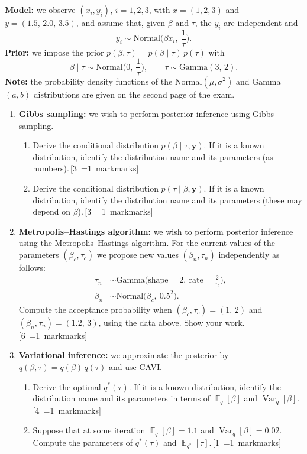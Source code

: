 \documentclass[11pt,a4paper]{article}
\newcommand{\mk}[1]{\hfill\hspace*{\fill}\mbox{\,[#1~\ifnum#1=1 mark\else marks\fi]}}
\newcommand{\ans}[1]{\par\nopagebreak[4]\vspace{2pt}\noindent\fbox{\rule{0pt}{#1}\hspace{\dimexpr\linewidth-2\fboxsep-2\fboxrule\relax}}\par\vspace{4pt}}
\newcommand{\qhead}[2]{\Needspace{10\baselineskip}\vspace{10pt}{\large\bfseries Question #1 (#2 marks)}\par\vspace{2pt}}
\DeclareMathOperator{\E}{\mathbb{E}}
\DeclareMathOperator{\Var}{Var}
\begin{document}
\clearpage
\qhead{7}{17}
\textbf{Model:} we observe $(x_i,y_i)$, $i=1,2,3$, with $x=(1,2,3)$ and $y=(1.5,\,2.0,\,3.5)$, and assume that, given $\beta$ and $\tau$, the $y_i$ are independent and
\[ y_i\sim\text{Normal}\Big(\beta x_i,\ \frac1\tau\Big). \]
\textbf{Prior:} we impose the prior $p(\beta,\tau)=p(\beta\mid\tau)\,p(\tau)$ with
\[ \beta\mid\tau\sim\text{Normal}\Big(0,\ \frac1\tau\Big),\qquad \tau\sim\text{Gamma}(3,\,2). \]
\textbf{Note:} the probability density functions of the Normal$(\mu,\sigma^2)$ and Gamma$(a,b)$ distributions are given on the second page of the exam.

\begin{enumerate}
\item \textbf{Gibbs sampling:} we wish to perform posterior inference using Gibbs sampling.
\begin{enumerate}
\item Derive the conditional distribution $p(\beta\mid\tau,\mathbf y)$. If it is a known distribution, identify the distribution name and its parameters (as numbers).\mk{3}
\ans{6.5cm}
\item Derive the conditional distribution $p(\tau\mid\beta,\mathbf y)$. If it is a known distribution, identify the distribution name and its parameters (these may depend on $\beta$).\mk{3}
\ans{6.5cm}
\end{enumerate}
\clearpage
\item \textbf{Metropolis--Hastings algorithm:} we wish to perform posterior inference using the Metropolis--Hastings algorithm. For the current values of the parameters $(\beta_c,\tau_c)$ we propose new values $(\beta_n,\tau_n)$ independently as follows:
\begin{align*}
\tau_n&\sim\text{Gamma}\Big(\text{shape}=2,\ \text{rate}=\frac{2}{\tau_c}\Big),\\
\beta_n&\sim\text{Normal}\big(\beta_c,\ 0.5^2\big).
\end{align*}
Compute the acceptance probability when $(\beta_c,\tau_c)=(1,\,2)$ and $(\beta_n,\tau_n)=(1.2,\,3)$, using the data above. Show your work.\mk{6}
\ans{9cm}
\item \textbf{Variational inference:} we approximate the posterior by $q(\beta,\tau)=q(\beta)\,q(\tau)$ and use CAVI.
\begin{enumerate}
\item Derive the optimal $q^*(\tau)$. If it is a known distribution, identify the distribution name and its parameters in terms of $\E_q[\beta]$ and $\Var_q[\beta]$.\mk{4}
\ans{6.5cm}
\item Suppose that at some iteration $\E_q[\beta]=1.1$ and $\Var_q[\beta]=0.02$. Compute the parameters of $q^*(\tau)$ and $\E_{q^*}[\tau]$.\mk{1}
\ans{3.5cm}
\end{enumerate}
\end{enumerate}
\end{document}
